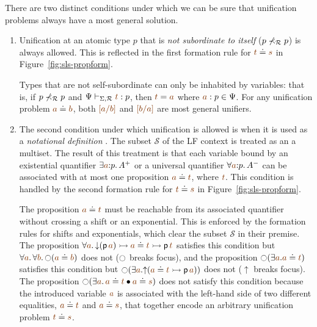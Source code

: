 There are two distinct conditions under which we can be sure that
unification problems always have a most general solution.  \smallskip
\begin{enumerate}
\item Unification at an atomic type $p$ that is {\it not subordinate
    to itself} ($p \not\prec_\mathcal R p$) is always allowed.  This is
  reflected in the first formation rule for $\lf{t} \doteq
  \lf{s}$ in Figure~\ref{fig:sls-propform}. 

  Types that are not self-subordinate can only be inhabited by
  variables: that is, if $p \not\prec_\mathcal R p$ and $\Psi
  \vdash_{\Sigma,\subord} \lf{t} : p$, then $\lf{t} = \lf{{a}}$ where
  $\lf{a}:p \in \Psi$. For any unification problem $\lf{{a}}
  \doteq \lf{{b}}$, both $\lf{[{a}/b]}$ and $\lf{[{b}/a]}$ are most
  general unifiers.

\item The second condition under which unification is allowed is when
  it is used as a {\it notational definition}
  \cite{pfenning99algorithms}. The subset $\mathcal S$ of the LF
  context is treated as an a multiset. The result of this treatment is
  that each variable bound by an existential quantifier $\exists
  \lf{a}{:}p.\,A^+$ or a universal quantifier $\forall
  \lf{a}{:}p.\,A^-$ can be associated with at most one proposition
  $\lf{a} \doteq \lf{t}$, where $\lf{t}$. This condition is handled by the
  second formation rule for $\lf{t} \doteq \lf{s}$ in
  Figure~\ref{fig:sls-propform}.


  The proposition $\lf{a} \doteq \lf{t}$ must be reachable from its
  associated quantifier without crossing a shift or an exponential.
  This is enforced by the formation rules for shifts and exponentials,
  which clear the subset $\mathcal S$ in their premise.  The
  proposition $\forall \lf{a}.\, {\downarrow}({\sf
    p}\,\lf{a}) \lefti \lf{a} \doteq \lf{t} \lefti {\sf p}\,\lf{t}$
  satisfies this condition but $\forall \lf{a}.\,\forall
  \lf{b}.\,{\ocircle}(\lf{a} \doteq \lf{b})$ does not ($\ocircle$
  breaks focus), and the proposition ${\ocircle}(\exists
  \lf{a}. \lf{a} \doteq \lf{t})$ satisfies this condition but
  ${\ocircle}(\exists \lf{a}.  {\uparrow}(\lf{a} \doteq \lf{t} \lefti
  {\sf p}\,\lf{a}))$ does not (${\uparrow}$ breaks focus).  The
  proposition ${\ocircle}(\exists \lf{a}.\, \lf{a} \doteq \lf{t} \fuse
  \lf{a} \doteq \lf{s})$ does not satisfy this condition because the
  introduced variable $\lf{a}$ is associated with the left-hand side
  of two different equalities, $\lf{a} \doteq \lf{t}$ and $\lf{a}
  \doteq \lf{s}$, that together encode an arbitrary unification
  problem $\lf{t} \doteq \lf{s}$.

\end{enumerate}
\smallskip

